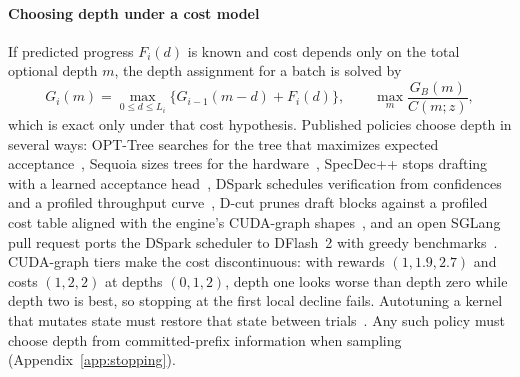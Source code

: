 \paragraph{Choosing depth under a cost model} If predicted progress $F_i(d)$ is known and cost depends only on the total optional depth $m$, the depth assignment for a batch is solved by
\begin{equation}
G_i(m)=\max_{0\le d\le L_i}\{G_{i-1}(m-d)+F_i(d)\},\qquad\max_m\frac{G_B(m)}{C(m;z)},\label{eq:schedDP}
\end{equation}
which is exact only under that cost hypothesis. Published policies choose depth in several ways: OPT-Tree searches for the tree that maximizes expected acceptance~\cite{opttree}, Sequoia sizes trees for the hardware~\cite{sequoia}, SpecDec++ stops drafting with a learned acceptance head~\cite{specdecpp}, DSpark schedules verification from confidences and a profiled throughput curve~\cite{dspark}, D-cut prunes draft blocks against a profiled cost table aligned with the engine's CUDA-graph shapes~\cite{dcut}, and an open SGLang pull request ports the DSpark scheduler to DFlash~2 with greedy benchmarks~\cite{pr36136}. CUDA-graph tiers make the cost discontinuous: with rewards $(1,1.9,2.7)$ and costs $(1,2,2)$ at depths $(0,1,2)$, depth one looks worse than depth zero while depth two is best, so stopping at the first local decline fails. Autotuning a kernel that mutates state must restore that state between trials~\cite{tritonautotune}. Any such policy must choose depth from committed-prefix information when sampling (Appendix~\ref{app:stopping}).
